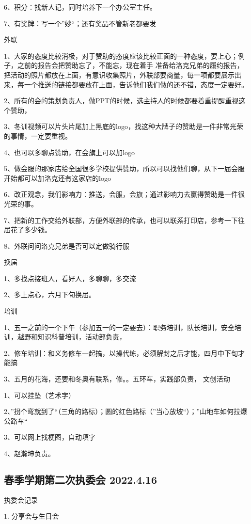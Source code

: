 \documentclass{ctexbook}
\begin{document}
6、积分：找新人记，同时培养下一个办公室主任。

7、有奖牌：写一个''妙``；还有奖品不管新老都要发

外联

1、大家的态度比较消极，对于赞助的态度应该比较正面的一种态度，要上心；例子，之前的报告会把赞助忘了，不能忘，现在着手 准备给洛克兄弟的履约报告，把活动的照片都放在上面，有意识收集照片，外联部要商量，每一项都要展示出来，每一个推送的链接都要放在上面，告诉他们我们做的还不错，态度一定要好。

2、所有的会的策划负责人，做PPT的时候，选主持人的时候都要着重提醒重视这个赞助，

3、冬训视频可以片头片尾加上黑底的logo，找这种大牌子的赞助是一件非常光荣的事情，一定要重视。

4、也可以多聊点赞助，在会旗上可以加logo

5、做会服的那家店给全国很多学校提供赞助，所以可以找他们聊，从下一届会服开始都可以加洛克还有这家店的logo

6、改正观念，我们影响力：推送，会服，会旗；通过影响力去赢得赞助是一件很光荣的事。

7、把新的工作交给外联部，方便外联部的传承，也可以联系打印店，参考一下往届花了多少钱。

8、外联问问洛克兄弟是否可以定做骑行服

换届

1、多找点接班人，看好人，多聊聊，多交流

2、多上点心，六月下旬换届。

培训

1、五一之前的一个下午（参加五一的一定要去）：职务培训，队长培训，安全培训，越野和知识科普培训，活动部负责，

2、修车培训：和义务修车一起搞，以操代练，必须解封之后才能，四月中下旬才能搞

3、五月的花海，还要和冬奥有联系，修。。五环车，实践部负责，
文创活动

1、可以挂坠（艺术字）

2、''拐个弯就到了``（三角的路标）；圆的红色路标（''当心放坡``）；''山地车如何拉爆公路车``

3、可以网上找梗图，自动填字

4、赵瀚坤负责。


\subsection{春季学期第二次执委会 2022.4.16}
执委会记录

1.	分享会与生日会
\end{document}
